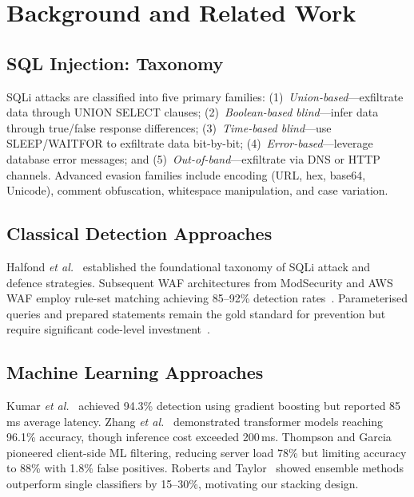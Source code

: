 \documentclass[10pt,twocolumn]{article}
\begin{document}
\section{Background and Related Work}
\label{sec:related}

\subsection{SQL Injection: Taxonomy}

SQLi attacks are classified into five primary families:
(1)~\emph{Union-based}---exfiltrate data through UNION SELECT clauses;
(2)~\emph{Boolean-based blind}---infer data through true/false response
differences; (3)~\emph{Time-based blind}---use SLEEP/WAITFOR to exfiltrate
data bit-by-bit; (4)~\emph{Error-based}---leverage database error messages;
and (5)~\emph{Out-of-band}---exfiltrate via DNS or HTTP channels.
Advanced evasion families include encoding (URL, hex, base64, Unicode),
comment obfuscation, whitespace manipulation, and case variation.

\subsection{Classical Detection Approaches}

Halfond \textit{et al.}~\cite{halfond2006} established the foundational
taxonomy of SQLi attack and defence strategies. Subsequent WAF architectures
from ModSecurity and AWS WAF employ rule-set matching achieving 85--92\%
detection rates~\cite{nsslabs2024}. Parameterised queries and prepared
statements remain the gold standard for prevention but require significant
code-level investment~\cite{owasp2024}.

\subsection{Machine Learning Approaches}

Kumar \textit{et al.}~\cite{kumar2024} achieved 94.3\% detection using
gradient boosting but reported 85\,ms average latency. Zhang \textit{et al.}~\cite{zhang2024}
demonstrated transformer models reaching 96.1\% accuracy, though inference
cost exceeded 200\,ms. Thompson and Garcia~\cite{thompson2024} pioneered
client-side ML filtering, reducing server load 78\% but limiting accuracy
to 88\% with 1.8\% false positives. Roberts and Taylor~\cite{roberts2024}
showed ensemble methods outperform single classifiers by 15--30\%,
motivating our stacking design.
\end{document}
